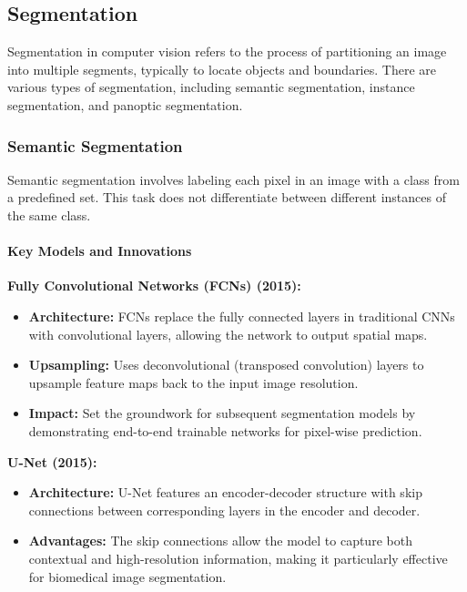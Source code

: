 \documentclass[12pt]{article}
\begin{document}
\subsection{Segmentation}

Segmentation in computer vision refers to the process of partitioning an image into multiple segments, typically to locate objects and boundaries. There are various types of segmentation, including semantic segmentation, instance segmentation, and panoptic segmentation.

\subsubsection{Semantic Segmentation}

Semantic segmentation involves labeling each pixel in an image with a class from a predefined set. This task does not differentiate between different instances of the same class.

\paragraph{Key Models and Innovations}

\textbf{Fully Convolutional Networks (FCNs) (2015):}
\begin{itemize}
    \item \textbf{Architecture:} FCNs replace the fully connected layers in traditional CNNs with convolutional layers, allowing the network to output spatial maps.
    \item \textbf{Upsampling:} Uses deconvolutional (transposed convolution) layers to upsample feature maps back to the input image resolution.
    \item \textbf{Impact:} Set the groundwork for subsequent segmentation models by demonstrating end-to-end trainable networks for pixel-wise prediction.
\end{itemize}

\textbf{U-Net (2015):}
\begin{itemize}
    \item \textbf{Architecture:} U-Net features an encoder-decoder structure with skip connections between corresponding layers in the encoder and decoder.
    \item \textbf{Advantages:} The skip connections allow the model to capture both contextual and high-resolution information, making it particularly effective for biomedical image segmentation.
\end{itemize}
\end{document}
